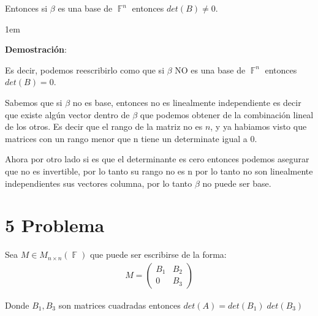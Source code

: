 \documentclass[12pt, fleqn]{article}                             %
\newenvironment{SmallIndentation}[1][0.75em]                    %
        {\begin{adjustwidth}{#1}{}\begin{footnotesize}}             %
        {\end{footnotesize}\end{adjustwidth}}                       %
\theoremstyle{break}                                            %
\DeclareMathOperator \GenericField {\mathbb{F}}                 %
\newcommand{\pVector}[1]                                        %
        { \ensuremath{\begin{pmatrix}#1\end{pmatrix}} }             %
\begin{document}
    Entonces si $\beta$ es una base de $\GenericField^n$ entonces $det(B) \neq 0$.

     \begin{SmallIndentation}[1em]
         \textbf{Demostración}:
         
        Es decir, podemos reescribirlo como que si $\beta$ NO es una base de $\GenericField^n$
        entonces $det(B) = 0$.

        Sabemos que si $\beta$ no es base, entonces no es linealmente independiente es decir
        que existe algún vector dentro de $\beta$ que podemos obtener de la combinación lineal
        de los otros. Es decir que el rango de la matriz no es $n$, y ya habiamos visto que matrices
        con un rango menor que n tiene un determinate igual a 0.

        Ahora por otro lado si es que el determinante es cero entonces podemos asegurar que no
        es invertible, por lo tanto su rango no es n por lo tanto no son linealmente independientes
        sus vectores columna, por lo tanto $\beta$ no puede ser base.

     \end{SmallIndentation}



\clearpage
\section{5 Problema}

    Sea $M \in M_{n \times n}(\GenericField)$ que puede ser escribirse de la forma:
    \begin{align*}
        M = \pVector{B_1 & B_2 \\ 0 & B_3}
    \end{align*}

    Donde $B_1, B_3$ son matrices cuadradas entonces $det(A) = det(B_1) \; det(B_3)$
\end{document}
